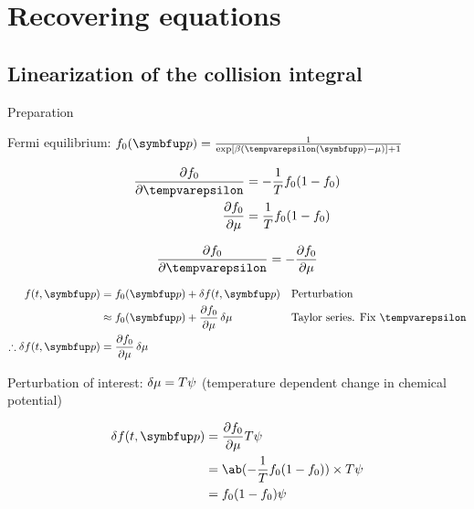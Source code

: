 \section{Recovering equations}

\subsection{Linearization of the collision integral}

\begin{frame}{Preparation}
  \begin{blk}{Fermi equilibrium:}
    \(f_0(\vv{p}) = \frac{1}{\exp[\beta(\epsilon(\vv{p}) - \mu)] + 1}\)
  \end{blk}

  \begin{align}
    \pdv{f_0}{\epsilon} & = -\frac{1}{T} f_0 (1 - f_0) \\
    \pdv{f_0}{\mu}      & = \frac{1}{T} f_0 (1 - f_0)
  \end{align}

  \begin{equation}
    \pdv{f_0}{\epsilon} = -\pdv{f_0}{\mu}
  \end{equation}
\end{frame}

\begin{frame}
  \begin{align}
    f(t, \vv{p})                   & = f_0(\vv{p}) + \fdif{f}(t, \vv{p})            &  & \textrm{Perturbation}                    \\
                                   & \approx f_0(\vv{p}) + \pdv{f_0}{\mu}\fdif{\mu} &  & \textrm{Taylor series. Fix \(\epsilon\)} \\
    \therefore \fdif{f}(t, \vv{p}) & = \pdv{f_0}{\mu}\fdif{\mu}
  \end{align}

  \begin{blk}{Perturbation of interest:}
    \(\fdif{\mu} = T\psi\) (temperature dependent change in chemical potential)
  \end{blk}
\end{frame}

\begin{frame}
  \begin{align}
    \fdif{f}(t, \vv{p}) & = \pdv{f_0}{\mu}T\psi                         \\
                        & = \ab(-\frac{1}{T} f_0(1 - f_0)) \times T\psi \\
                        & = f_0(1 - f_0) \psi
  \end{align}
\end{frame}

